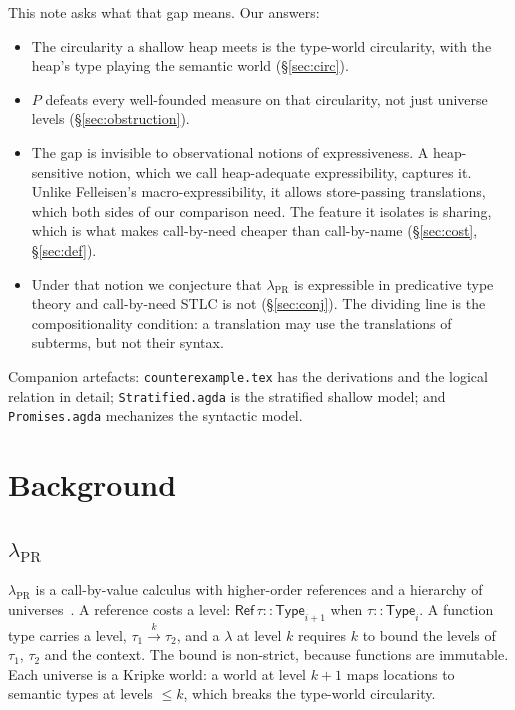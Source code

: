 \documentclass[11pt]{article}
\theoremstyle{remark}
\newcommand{\lpr}{\lambda_{\mathrm{PR}}}
\newcommand{\tRef}{\mathsf{Ref}\,}
\newcommand{\Type}[1]{\mathsf{Type}_{#1}}
\newcommand{\arr}[1]{\xrightarrow{#1}}
\begin{document}
This note asks what that gap means. Our answers:
\begin{itemize}
  \item The circularity a shallow heap meets is the type-world circularity,
    with the heap's type playing the semantic world (\S\ref{sec:circ}).
  \item $P$ defeats every well-founded measure on that circularity, not just
    universe levels (\S\ref{sec:obstruction}).
  \item The gap is invisible to observational notions of expressiveness. A
    heap-sensitive notion, which we call heap-adequate expressibility,
    captures it. Unlike Felleisen's macro-expressibility, it allows
    store-passing translations, which both sides of our comparison need.
    The feature it isolates is sharing, which is what makes call-by-need
    cheaper than call-by-name (\S\ref{sec:cost}, \S\ref{sec:def}).
  \item Under that notion we conjecture that $\lpr$ is expressible in
    predicative type theory and call-by-need STLC is not
    (\S\ref{sec:conj}). The dividing line is the compositionality
    condition: a translation may use the translations of subterms, but not
    their syntax.
\end{itemize}
Companion artefacts:
\texttt{counterexample.tex} has the derivations and the logical relation in
detail; \texttt{Stratified.agda} is the stratified shallow model; and
\texttt{Promises.agda} mechanizes the syntactic model.

\section{Background}

\subsection{$\lpr$}

$\lpr$ is a call-by-value calculus with higher-order references and a
hierarchy of universes~\cite{koronkevich2025}. A reference costs a level:
$\tRef \tau :: \Type{i+1}$ when $\tau :: \Type{i}$. A function type carries a
level, $\tau_1 \arr{k} \tau_2$, and a $\lambda$ at level $k$ requires $k$
to bound the levels of $\tau_1$, $\tau_2$ and the context. The bound is
non-strict, because functions are immutable. Each universe is a Kripke
world: a world at level $k+1$ maps locations to semantic types at levels
$\le k$, which breaks the type-world circularity.
\end{document}

